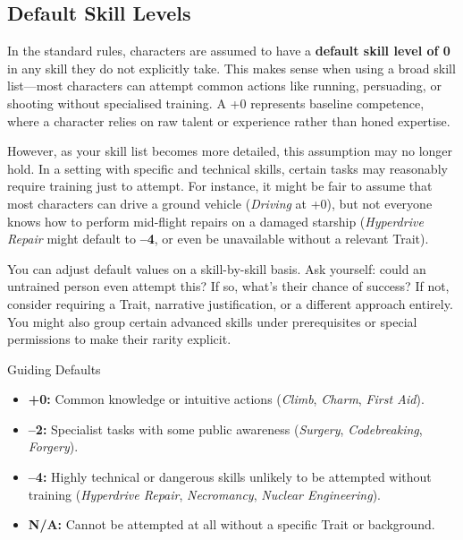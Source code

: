 \subsection{Default Skill Levels}

In the standard \wyrd rules, characters are assumed to have a \textbf{default skill level of 0} in any skill they do not explicitly take. This makes sense when using a broad skill list—most characters can attempt common actions like running, persuading, or shooting without specialised training. A +0 represents baseline competence, where a character relies on raw talent or experience rather than honed expertise.

However, as your skill list becomes more detailed, this assumption may no longer hold. In a setting with specific and technical skills, certain tasks may reasonably require training just to attempt. For instance, it might be fair to assume that most characters can drive a ground vehicle (\textit{Driving} at +0), but not everyone knows how to perform mid-flight repairs on a damaged starship (\textit{Hyperdrive Repair} might default to \textbf{–4}, or even be unavailable without a relevant Trait).

You can adjust default values on a skill-by-skill basis. Ask yourself: could an untrained person even attempt this? If so, what’s their chance of success? If not, consider requiring a Trait, narrative justification, or a different approach entirely. You might also group certain advanced skills under prerequisites or special permissions to make their rarity explicit.

\begin{CommentBox}{Guiding Defaults}
    \begin{itemize}
        \item \textbf{+0:} Common knowledge or intuitive actions (\textit{Climb}, \textit{Charm}, \textit{First Aid}).
        \item \textbf{–2:} Specialist tasks with some public awareness (\textit{Surgery}, \textit{Codebreaking}, \textit{Forgery}).
        \item \textbf{–4:} Highly technical or dangerous skills unlikely to be attempted without training (\textit{Hyperdrive Repair}, \textit{Necromancy}, \textit{Nuclear Engineering}).
        \item \textbf{N/A:} Cannot be attempted at all without a specific Trait or background.
    \end{itemize}
\end{CommentBox}

